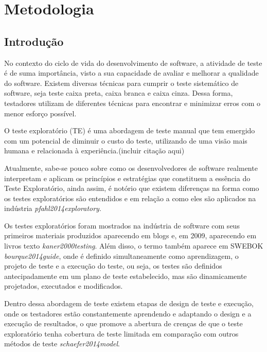 \chapter[Metodologia]{Metodologia}

\section{Introdução}
\par No contexto do ciclo de vida do desenvolvimento de software, a atividade de teste é de suma importância, visto a sua capacidade de avaliar e melhorar  a qualidade do software. Existem diversas técnicas para cumprir o teste sistemático de software, seja teste caixa preta, caixa branca e caixa cinza. Dessa forma, testadores utilizam de diferentes técnicas para encontrar e minimizar erros com o menor esforço possível. 

\par O teste exploratório (TE) é uma abordagem de teste manual que tem emergido com um potencial de diminuir o custo do teste, utilizando de uma visão mais humana e relacionada à experiência.(incluir citação aqui)

\par Atualmente, sabe-se pouco sobre como os desenvolvedores de software realmente interpretam e aplicam os princípios e estratégias que constituem a essência do Teste Exploratório, ainda assim, é notório que existem diferenças na forma como os testes exploratórios são entendidos e em relação a como eles são aplicados na indústria \textit{pfahl2014exploratory}.  

\par Os testes exploratórios foram mostrados na indústria de software com seus primeiros materiais produzidos aparecendo em blogs e, em 2009, aparecendo em livros texto \textit{kaner2000testing}. Além disso, o termo também aparece em SWEBOK \textit{bourque2014guide}, onde é definido simultaneamente como aprendizagem, o projeto de teste e a execução do teste, ou seja, os testes são definidos antecipadamente em um plano de teste estabelecido, mas são dinamicamente projetados, executados e modificados. 

\par Dentro dessa abordagem de teste existem etapas de design de teste e execução, onde os testadores estão constantemente aprendendo e adaptando o design e a execução de resultados, o que promove a abertura de crenças de que o teste exploratório tenha cobertura de teste limitada em comparação com outros métodos de teste \textit{schaefer2014model}.


